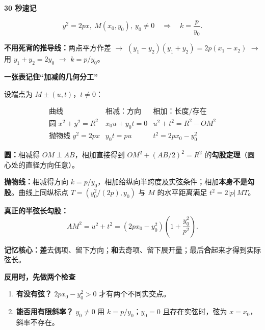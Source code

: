 \begin{summarybox}
\small
\par\medskip
\begin{minipage}{\linewidth}
\noindent
\textbf{\textcolor{CSummary}{30 秒速记}}\par\nobreak\smallskip
\[
\boxed{y^2=2px,\ M(x_0,y_0),\ y_0\ne0\quad\Longrightarrow\quad
 k=\frac{p}{y_0}}.
\]\par
\end{minipage}
\par

\par\noindent\textbf{不用死背的推导线：}两点平方作差 $\to$ $(y_1-y_2)(y_1+y_2)=2p(x_1-x_2)$ $\to$ 用 $y_1+y_2=2y_0$ $\to$ $k=p/y_0$。
\par\medskip
\begin{minipage}{\linewidth}
\noindent
\textbf{\textcolor{CSummary}{一张表记住“加减的几何分工”}}\par\nobreak\smallskip
设端点为 $M\pm(u,t)$，$t\ne0$：\par
\end{minipage}
\par

\[
\begin{array}{c|c|c}
\text{曲线}&\text{相减：方向}&\text{相加：长度/存在}\\\hline
\text{圆 }x^2+y^2=R^2&x_0u+y_0t=0&u^2+t^2=R^2-OM^2\\
\text{抛物线 }y^2=2px&y_0t=pu&t^2=2px_0-y_0^2
\end{array}
\]
\par\noindent\textbf{圆：}相减得 $OM\perp AB$，相加直接得到 $OM^2+(AB/2)^2=R^2$ 的\textbf{勾股定理}（圆心处的直径方向任意）。
\par\noindent\textbf{抛物线：}相减得方向 $k=p/y_0$，相加给纵向半跨度及实弦条件；相加\textbf{本身不是勾股}。曲线上同纵标点 $T=(y_0^2/(2p),y_0)$ 与 $M$ 的水平距离满足 $t^2=2|p|\,MT$。
\par\noindent\textbf{真正的半弦长勾股：}
\[
\boxed{AM^2=u^2+t^2
 =(2px_0-y_0^2)\left(1+\frac{y_0^2}{p^2}\right)}.
\]
\par\noindent\textbf{记忆核心：}\textbf{差}去偶项、留下方向；\textbf{和}去奇项、留下展开量；最后\textbf{合}起来才得到实际弦长。
\par\medskip
\begin{minipage}{\linewidth}
\noindent
\textbf{\textcolor{CSummary}{反用时，先做两个检查}}\par\nobreak\smallskip
\begin{enumerate}[leftmargin=*,itemsep=0.2em]
 \item \textbf{有没有弦？} $\boxed{2px_0-y_0^2>0}$ 才有两个不同实交点。
 \item \textbf{能否用有限斜率？} $y_0\ne0$ 用 $k=p/y_0$；$y_0=0$ 且存在实弦时，弦为 $x=x_0$，斜率不存在。
\end{enumerate}\par
\end{minipage}
\par


\end{summarybox}
